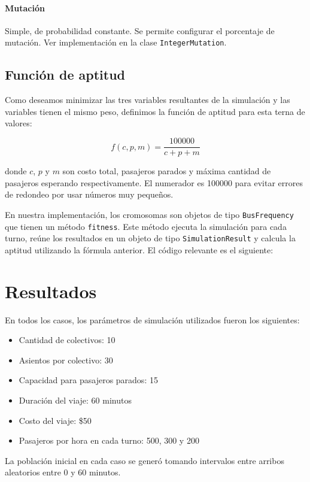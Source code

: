 \documentclass[a4paper,12pt]{article}
\begin{document}
\paragraph{Mutación} Simple, de probabilidad constante. Se permite configurar el porcentaje de mutación.
Ver implementación en la clase \texttt{IntegerMutation}.

\subsection{Función de aptitud}

Como deseamos minimizar las tres variables resultantes de la simulación y las variables tienen el mismo peso, definimos la función de aptitud para esta terna de valores:

\[ f(c, p, m) = \frac{100000}{c + p + m} \]

donde $c$, $p$ y $m$ son costo total, pasajeros parados y máxima cantidad de pasajeros esperando respectivamente.
El numerador es 100000 para evitar errores de redondeo por usar números muy pequeños.

En nuestra implementación, los cromosomas son objetos de tipo \texttt{BusFrequency} que tienen un método \texttt{fitness}.
Este método ejecuta la simulación para cada turno, reúne los resultados en un objeto de tipo \texttt{SimulationResult} y calcula la aptitud utilizando la fórmula anterior.
El código relevante es el siguiente:



\section{Resultados}

En todos los casos, los parámetros de simulación utilizados fueron los siguientes:

\begin{itemize}
	\item Cantidad de colectivos: 10
	\item Asientos por colectivo: 30
	\item Capacidad para pasajeros parados: 15
	\item Duración del viaje: 60 minutos
	\item Costo del viaje: \$50
	\item Pasajeros por hora en cada turno: 500, 300 y 200
\end{itemize}

La población inicial en cada caso se generó tomando intervalos entre arribos aleatorios entre 0 y 60 minutos.
\end{document}

